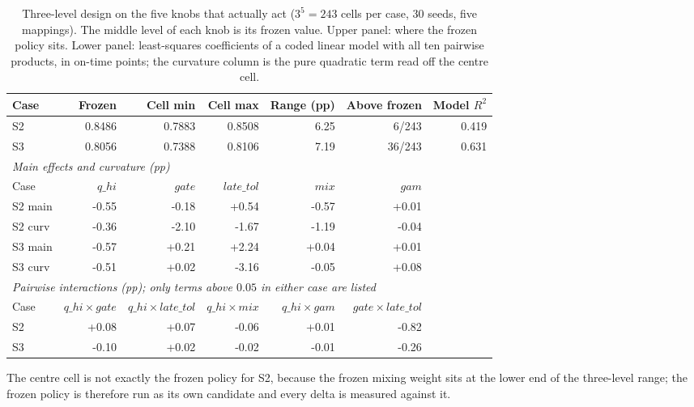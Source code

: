 \begin{table}[H]
\centering
\caption{Three-level design on the five knobs that actually act ($3^5=243$ cells per case, 30 seeds, five mappings). The middle level of each knob is its frozen value. Upper panel: where the frozen policy sits. Lower panel: least-squares coefficients of a coded linear model with all ten pairwise products, in on-time points; the curvature column is the pure quadratic term read off the centre cell.}
\label{tab:p3-threelevel}
\scriptsize
\begin{tabular}{lrrrrrr}
\toprule
Case & Frozen & Cell min & Cell max & Range (pp) & Above frozen & Model $R^2$ \\
\midrule
S2 & 0.8486 & 0.7883 & 0.8508 & 6.25 & 6/243 & 0.419 \\
S3 & 0.8056 & 0.7388 & 0.8106 & 7.19 & 36/243 & 0.631 \\
\midrule
\multicolumn{7}{l}{\emph{Main effects and curvature (pp)}}\\
\midrule
Case & $q\_hi$ & $gate$ & $late\_tol$ & $mix$ & $gam$ \\
\midrule
S2 main & -0.55 & -0.18 & +0.54 & -0.57 & +0.01 \\
S2 curv & -0.36 & -2.10 & -1.67 & -1.19 & -0.04 \\
S3 main & -0.57 & +0.21 & +2.24 & +0.04 & +0.01 \\
S3 curv & -0.51 & +0.02 & -3.16 & -0.05 & +0.08 \\
\midrule
\multicolumn{7}{l}{\emph{Pairwise interactions (pp); only terms above $0.05$ in either case are listed}}\\
\midrule
Case & $q\_hi\times gate$ & $q\_hi\times late\_tol$ & $q\_hi\times mix$ & $q\_hi\times gam$ & $gate\times late\_tol$ \\
\midrule
S2 & +0.08 & +0.07 & -0.06 & +0.01 & -0.82 \\
S3 & -0.10 & +0.02 & -0.02 & -0.01 & -0.26 \\
\bottomrule
\end{tabular}
\par\smallskip\footnotesize The centre cell is not exactly the frozen policy for S2, because the frozen mixing weight sits at the lower end of the three-level range; the frozen policy is therefore run as its own candidate and every delta is measured against it.
\end{table}
